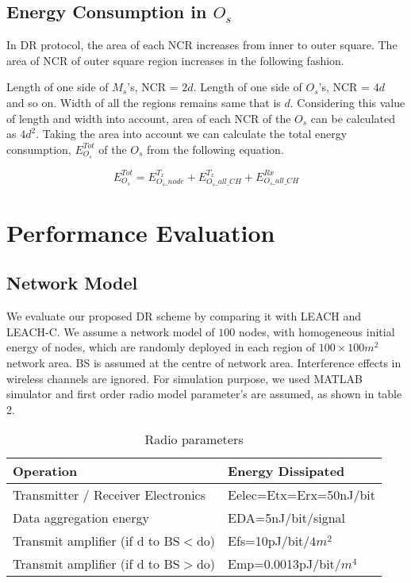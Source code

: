 \documentclass[3p,times,procedia]{elsarticle}
\begin{document}
\subsection{Energy Consumption in $O_{s}$}
In DR protocol, the area of each NCR increases from inner to outer square. The area of NCR of outer square region increases in the following fashion.

Length of one side of $M_s$'s, NCR = $2d$. Length of one side of $O_s$'s, NCR = $4d$ and so on. Width of all the regions remains same that is $d$. Considering this value of length and width into account, area of each NCR of the $O_s$ can be calculated as $4d^{2}$. Taking the area into account we can calculate the total energy consumption, $E^{Tot}_{O_{s}}$ of the $O_s$ from the following equation.

\begin{equation}
  E^{Tot}_{O_{s}} = E^{T_{x}}_{O_{s}\_node} + E^{T_{x}}_{O_{s}\_all\_CH} + E^{Rx}_{O_{s}\_all\_CH}
\end{equation}


\section{Performance Evaluation}        \subsection{Network Model}
We evaluate our proposed DR scheme by comparing it with LEACH and LEACH-C. We assume a network model of $100$ nodes, with homogeneous initial energy of nodes, which are randomly deployed in each region of  $100 \times 100 m^2$ network area. BS is assumed at the centre of network area. Interference effects in wireless channels are ignored. For simulation purpose, we used MATLAB simulator and first order radio model parameter's are assumed, as shown in table 2.
\begin{table}[h]
\centering
\caption{Radio parameters}
\begin{tabular}{|l|l|}
\hline
Operation & Energy Dissipated  \\
\hline
Transmitter / Receiver Electronics  & Eelec=Etx=Erx=50nJ/bit \\
\hline
Data aggregation energy & EDA=5nJ/bit/signal \\
\hline
Transmit amplifier (if d to BS$<$do) & Efs=10pJ/bit/$4m^{2}$ \\
\hline
Transmit amplifier (if d to BS$>$do) & Emp=0.0013pJ/bit/$m^{4}$\\
\hline
\end{tabular}
\end{table}
\end{document}
